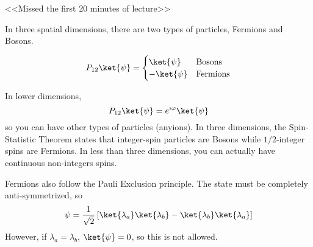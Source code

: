 \documentclass[a4paper,twoside,master.tex]{subfiles}
\begin{document}

<<Missed the first 20 minutes of lecture>>

In three spatial dimensions, there are two types of particles, Fermions and Bosons.

\begin{equation}
    P_{12}\ket{\psi} = \begin{cases}\ket{\psi} & \text{Bosons} \\ -\ket{\psi} & \text{Fermions} \end{cases}
\end{equation}

In lower dimensions,
\begin{equation}
    P_{12}\ket{\psi} = e^{\imath \varphi}\ket{\psi}
\end{equation}
so you can have other types of particles (anyions). In three dimensions, the Spin-Statistic Theorem states that integer-spin particles are Bosons while $ 1/2 $-integer spins are Fermions. In less than three dimensions, you can actually have continuous non-integers spins.


Fermions also follow the Pauli Exclusion principle. The state must be completely anti-symmetrized, so
\begin{equation}
    \psi = \frac{1}{\sqrt{2}} \left[\ket{\lambda_a}\ket{\lambda_b} -\ket{\lambda_b}\ket{\lambda_a} \right]
\end{equation}
However, if $ \lambda_a = \lambda_b $, $\ket{\psi} = 0 $, so this is not allowed.
\end{document}
